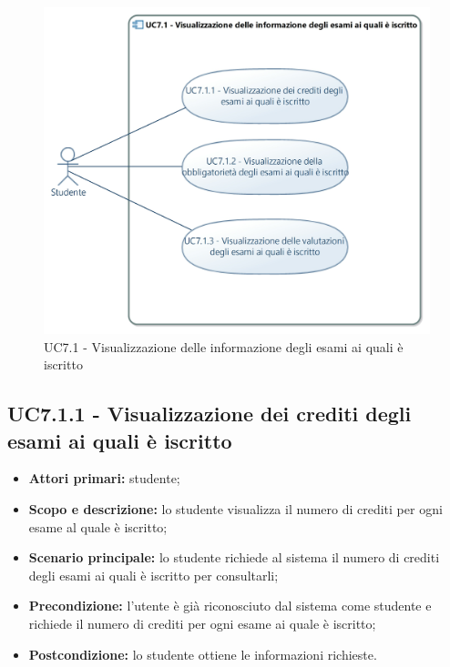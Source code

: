 \documentclass[AnalisiDeiRequisiti.tex]{subfiles}
\begin{document}
\begin{figure}[H]
	\centering
	\includegraphics[width=1.0\linewidth]{UC7_1.jpg}
	\caption{UC7.1 - Visualizzazione delle informazione degli esami ai quali è iscritto}
	\label{fig:UC7.1 - Visualizzazione delle informazione degli esami ai quali 'e iscritto}
\end{figure}

\subsection{UC7.1.1 - Visualizzazione dei crediti degli esami ai quali è iscritto}
\begin{itemize}
\item \textbf{Attori primari:} studente;
\item \textbf{Scopo e descrizione:} lo studente visualizza il numero di crediti per ogni esame al quale è iscritto;
\item \textbf{Scenario principale:} lo studente richiede al sistema il numero di crediti degli esami ai quali è iscritto per consultarli;
\item \textbf{Precondizione:} l'utente è già riconosciuto dal sistema come studente e richiede il numero di crediti per ogni esame ai quale è iscritto;
\item \textbf{Postcondizione:} lo studente ottiene le informazioni richieste.
\end{itemize}
\end{document}

